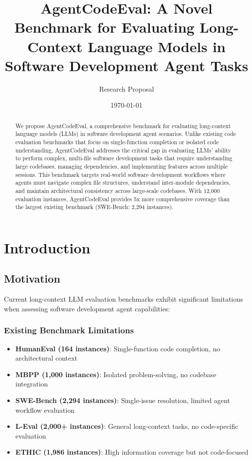 \documentclass{article}
\title{AgentCodeEval: A Novel Benchmark for Evaluating Long-Context Language Models in Software Development Agent Tasks}
\author{Research Proposal}
\date{\today}
\begin{document}
\maketitle

\begin{abstract}
We propose AgentCodeEval, a comprehensive benchmark for evaluating long-context language models (LLMs) in software development agent scenarios. Unlike existing code evaluation benchmarks that focus on single-function completion or isolated code understanding, AgentCodeEval addresses the critical gap in evaluating LLMs' ability to perform complex, multi-file software development tasks that require understanding large codebases, managing dependencies, and implementing features across multiple sessions. This benchmark targets real-world software development workflows where agents must navigate complex file structures, understand inter-module dependencies, and maintain architectural consistency across large-scale codebases. With 12,000 evaluation instances, AgentCodeEval provides 5x more comprehensive coverage than the largest existing benchmark (SWE-Bench: 2,294 instances).
\end{abstract}

\section{Introduction}

\subsection{Motivation}
Current long-context LLM evaluation benchmarks exhibit significant limitations when assessing software development agent capabilities:

\subsubsection{Existing Benchmark Limitations}
\begin{itemize}
    \item \textbf{HumanEval (164 instances)}: Single-function code completion, no architectural context
    \item \textbf{MBPP (1,000 instances)}: Isolated problem-solving, no codebase integration
    \item \textbf{SWE-Bench (2,294 instances)}: Single-issue resolution, limited agent workflow evaluation
    \item \textbf{L-Eval (2,000+ instances)}: General long-context tasks, no code-specific evaluation
    \item \textbf{ETHIC (1,986 instances)}: High information coverage but not code-focused
\end{itemize}
\end{document}
